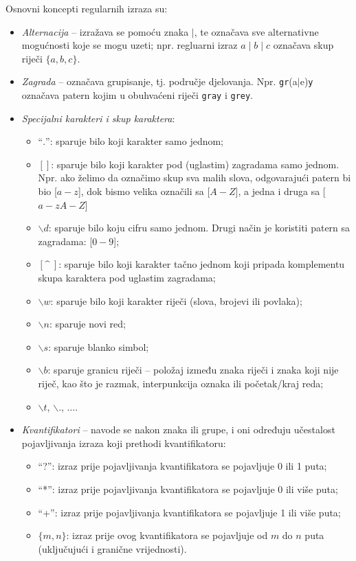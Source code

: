 Osnovni koncepti regularnih izraza su:
\begin{itemize}
	\item \textit{Alternacija} -- izražava se pomoću znaka $\mid$, te označava sve alternativne mogućnosti koje se mogu uzeti; npr. regluarni izraz $a\mid b\mid c$ označava skup riječi $\{a, b, c\}$.  
	\item \textit{Zagrada} -- označava grupisanje, tj. područje djelovanja. Npr. \texttt{gr}(a$\mid$e)\texttt{y} označava patern kojim u obuhvaćeni riječi \texttt{gray} i \texttt{grey}.
    \item \textit{Specijalni karakteri i skup karaktera}:
    \begin{itemize}
    	\item ``$.$'': sparuje bilo koji karakter samo jednom; 
    	\item $[]$: sparuje bilo koji karakter pod (uglastim) zagradama samo jednom. Npr. ako želimo da označimo skup sva malih slova, odgovarajući patern bi bio [$a-z$], dok bismo velika označili sa [$A-Z$], a jedna i druga sa [$a-zA-Z$]
    	\item $\backslash d$: sparuje bilo koju cifru samo jednom. Drugi način je koristiti patern sa zagradama: [$0-9$];
    	\item $[\^ \  ]$: sparuje bilo koji karakter tačno jednom koji pripada komplementu skupa karaktera pod
    	uglastim zagradama; 
    	\item $\backslash w$: sparuje bilo koji karakter riječi (slova, brojevi ili povlaka); 
    	\item $\backslash n$: sparuje novi red;
    	\item $\backslash s$: sparuje blanko simbol; 
    	\item $\backslash b$: sparuje granicu riječi -- položaj između znaka riječi i znaka koji nije riječ, kao što je razmak, interpunkcija oznaka ili početak/kraj reda;
    	\item $\backslash t$, $\backslash .$, $\ldots$.
    \end{itemize}
	\item  \textit{Kvantifikatori} -- navode se nakon znaka ili grupe, i oni određuju  učestalost
pojavljivanja izraza koji prethodi kvantifikatoru:
\begin{itemize}
	\item ``?'': izraz prije pojavljivanja kvantifikatora se pojavljuje 0 ili 1 puta; %
	\item ``*'': izraz prije pojavljivanja kvantifikatora se pojavljuje 0 ili više puta;
	\item  ``+'': izraz prije pojavljivanja kvantifikatora se pojavljuje  1 ili više puta;
	\item $\{m,n\}$: izraz prije ovog kvantifikatora se pojavljuje od $m$ do $n$ puta (uključujući i granične vrijednosti).
\end{itemize}
\end{itemize}

